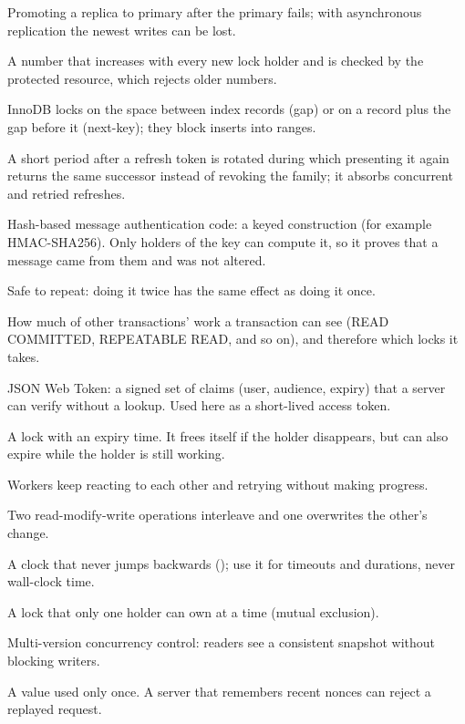 \documentclass[11pt,openany]{book}
\makeatletter
\DeclareRobustCommand{\code}[1]{\texttt{\expandafter\code@quotes\expandafter{\detokenize{#1}}}}
\newcommand{\code@quotes}[1]{\saveexpandmode\expandarg
  \StrSubstitute{#1}{'}{\noexpand\textquotesingle}[\code@tmp]%
  \StrSubstitute{\code@tmp}{`}{\noexpand\textasciigrave}[\code@tmp]%
  \StrSubstitute{\code@tmp}{::}{::\noexpand\allowbreak}[\code@tmp]%
  \restoreexpandmode\code@tmp}
\makeatother
\begin{document}
\begin{description}[style=unboxed,leftmargin=0pt,labelsep=.5em,itemsep=3pt,parsep=0pt,font=\sffamily\bfseries\color{navy}]
\item[Failover] Promoting a replica to primary after the primary fails; with asynchronous replication the newest writes can be lost.
\item[Fencing token] A number that increases with every new lock holder and is checked by the protected resource, which rejects older numbers.
\item[Gap lock, next-key lock] InnoDB locks on the space between index records (gap) or on a record plus the gap before it (next-key); they block inserts into ranges.
\item[Grace window] A short period after a refresh token is rotated during which presenting it again returns the same successor instead of revoking the family; it absorbs concurrent and retried refreshes.
\item[HMAC] Hash-based message authentication code: a keyed construction (for example HMAC-SHA256). Only holders of the key can compute it, so it proves that a message came from them and was not altered.
\item[Idempotent] Safe to repeat: doing it twice has the same effect as doing it once.
\item[Isolation level] How much of other transactions' work a transaction can see (READ COMMITTED, REPEATABLE READ, and so on), and therefore which locks it takes.
\item[JWT] JSON Web Token: a signed set of claims (user, audience, expiry) that a server can verify without a lookup. Used here as a short-lived access token.
\item[Lease] A lock with an expiry time. It frees itself if the holder disappears, but can also expire while the holder is still working.
\item[Livelock] Workers keep reacting to each other and retrying without making progress.
\item[Lost update] Two read-modify-write operations interleave and one overwrites the other's change.
\item[Monotonic clock] A clock that never jumps backwards (\code{CLOCK_MONOTONIC}); use it for timeouts and durations, never wall-clock time.
\item[Mutex] A lock that only one holder can own at a time (mutual exclusion).
\item[MVCC] Multi-version concurrency control: readers see a consistent snapshot without blocking writers.
\item[Nonce] A value used only once. A server that remembers recent nonces can reject a replayed request.

\end{description}
\end{document}
